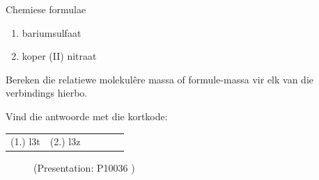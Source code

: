 \begin{exercises}{Chemiese formulae }
\begin{enumerate}[noitemsep, label=\textbf{\arabic*}. ]
\begin{enumerate}[noitemsep, label=\textbf{\alph*}. ]
\label{m38689*uid106}\item bariumsulfaat
\item koper (II) nitraat
\end{enumerate}
Bereken die relatiewe molekul\^{e}re massa of formule-massa vir elk van die verbindings hierbo.
                \end{enumerate}
\label{m38689*cid121}
\par {} Vind die antwoorde met die kortkode:
 \par \begin{tabular}[h]{cccccc}
 (1.) l3t  &  (2.) l3z  & \end{tabular}
\end{exercises}
    \label{m38689*eip-891}
    \setcounter{subfigure}{0}
	\begin{figure}[H] %
    \label{m38689*slidesharemedia}\label{m38689*slideshareflash} { (Presentation:  P10036 )}
      \vspace{2pt}
    \vspace{.1in}
 \end{figure}       \par \label{m38689*cid13}
